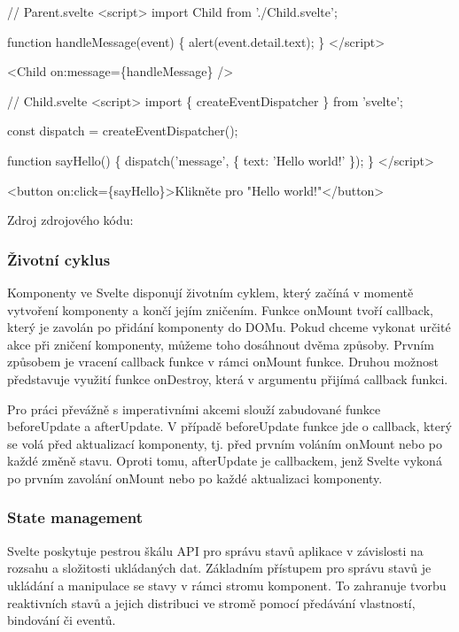 \begin{prog}
// Parent.svelte
<script>
  import Child from './Child.svelte';

  function handleMessage(event) \{
    alert(event.detail.text);
  \}
</script>

<Child on:message=\{handleMessage\} />

// Child.svelte
<script>
  import \{ createEventDispatcher \} from 'svelte';

  const dispatch = createEventDispatcher();

  function sayHello() \{
    dispatch('message', \{
      text: 'Hello world!'
    \});
  \}
</script>

<button on:click=\{sayHello\}>Klikněte pro "Hello world!"</button>
\end{prog}

Zdroj zdrojového kódu: \cite{svelte}

\subsubsection{Životní cyklus}

Komponenty ve Svelte disponují životním cyklem, který začíná v momentě vytvoření komponenty a končí jejím zničením. 
Funkce onMount tvoří callback, který je zavolán po přidání komponenty do DOMu. Pokud chceme vykonat určité akce při zničení komponenty, můžeme toho dosáhnout dvěma způsoby. 
Prvním způsobem je vracení callback funkce v rámci onMount funkce. Druhou možnost představuje využití funkce onDestroy, která v argumentu přijímá callback funkci. 

Pro práci převážně s imperativními akcemi slouží zabudované funkce beforeUpdate a afterUpdate. 
V případě beforeUpdate funkce jde o callback, který se volá před aktualizací komponenty, tj. před prvním voláním onMount nebo po každé změně stavu. 
Oproti tomu, afterUpdate je callbackem, jenž Svelte vykoná po prvním zavolání onMount nebo po každé aktualizaci komponenty.\cite{sveltehandbook,svelte}

\subsubsection{State management}

Svelte poskytuje pestrou škálu API pro správu stavů aplikace v závislosti na rozsahu a složitosti ukládaných dat. 
Základním přístupem pro správu stavů je ukládání a manipulace se stavy v rámci stromu komponent. 
To zahranuje tvorbu reaktivních stavů a jejich distribuci ve stromě pomocí předávání vlastností, bindování či eventů. 

